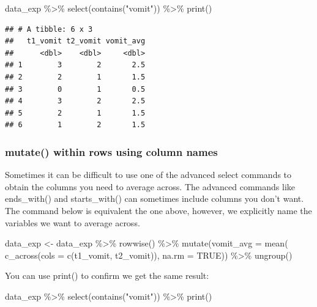 \documentclass[
]{krantz}
\makeatletter
\newenvironment{Shaded}{\begin{snugshade}}{\end{snugshade}}
\newcommand{\AttributeTok}[1]{\textcolor[rgb]{0.61,0.61,0.61}{#1}}
\newcommand{\ConstantTok}[1]{\textcolor[rgb]{0,0,0}{#1}}
\newcommand{\FunctionTok}[1]{\textcolor[rgb]{0,0,0}{#1}}
\newcommand{\NormalTok}[1]{#1}
\newcommand{\OtherTok}[1]{\textcolor[rgb]{0.37,0.37,0.37}{#1}}
\newcommand{\SpecialCharTok}[1]{\textcolor[rgb]{0,0,0}{#1}}
\newcommand{\StringTok}[1]{\textcolor[rgb]{0.5,0.5,0.5}{#1}}
\newenvironment{kframe}{%
\medskip{}
\setlength{\fboxsep}{.8em}
 \def\at@end@of@kframe{}%
 \ifinner\ifhmode%
  \def\at@end@of@kframe{\end{minipage}}%
  \begin{minipage}{\columnwidth}%
 \fi\fi%
 \def\FrameCommand##1{\hskip\@totalleftmargin \hskip-\fboxsep
 \colorbox{shadecolor}{##1}\hskip-\fboxsep
     \hskip-\linewidth \hskip-\@totalleftmargin \hskip\columnwidth}%
 \MakeFramed {\advance\hsize-\width
   \@totalleftmargin\z@ \linewidth\hsize
   \@setminipage}}%
 {\par\unskip\endMakeFramed%
 \at@end@of@kframe}
\renewenvironment{Shaded}{\begin{kframe}}{\end{kframe}}
\makeatother
\begin{document}
\begin{Shaded}
\begin{Highlighting}[]
\NormalTok{data\_exp }\SpecialCharTok{\%\textgreater{}\%}
  \FunctionTok{select}\NormalTok{(}\FunctionTok{contains}\NormalTok{(}\StringTok{"vomit"}\NormalTok{)) }\SpecialCharTok{\%\textgreater{}\%}
  \FunctionTok{print}\NormalTok{()}
\end{Highlighting}
\end{Shaded}

\begin{verbatim}
## # A tibble: 6 x 3
##   t1_vomit t2_vomit vomit_avg
##      <dbl>    <dbl>     <dbl>
## 1        3        2       2.5
## 2        2        1       1.5
## 3        0        1       0.5
## 4        3        2       2.5
## 5        2        1       1.5
## 6        1        2       1.5
\end{verbatim}

\hypertarget{mutate-within-rows-using-column-names}{%
\subsubsection{mutate() within rows using column names}\label{mutate-within-rows-using-column-names}}

Sometimes it can be difficult to use one of the advanced select commands to obtain the columns you need to average across. The advanced commands like ends\_with() and starts\_with() can sometimes include columns you don't want. The command below is equivalent the one above, however, we explicitly name the variables we want to average across.

\begin{Shaded}
\begin{Highlighting}[]
\NormalTok{data\_exp }\OtherTok{\textless{}{-}}\NormalTok{ data\_exp }\SpecialCharTok{\%\textgreater{}\%} 
  \FunctionTok{rowwise}\NormalTok{() }\SpecialCharTok{\%\textgreater{}\%} 
  \FunctionTok{mutate}\NormalTok{(}\AttributeTok{vomit\_avg =} \FunctionTok{mean}\NormalTok{( }\FunctionTok{c\_across}\NormalTok{(}\AttributeTok{cols =} \FunctionTok{c}\NormalTok{(t1\_vomit, t2\_vomit)),}
                           \AttributeTok{na.rm =} \ConstantTok{TRUE}\NormalTok{)) }\SpecialCharTok{\%\textgreater{}\%}
  \FunctionTok{ungroup}\NormalTok{()}
\end{Highlighting}
\end{Shaded}

You can use print() to confirm we get the same result:

\begin{Shaded}
\begin{Highlighting}[]
\NormalTok{data\_exp }\SpecialCharTok{\%\textgreater{}\%}
  \FunctionTok{select}\NormalTok{(}\FunctionTok{contains}\NormalTok{(}\StringTok{"vomit"}\NormalTok{)) }\SpecialCharTok{\%\textgreater{}\%}
  \FunctionTok{print}\NormalTok{()}
\end{Highlighting}
\end{Shaded}
\end{document}
